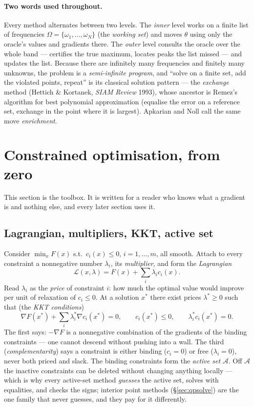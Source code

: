 \documentclass[11pt,a4paper]{article}
\newcommand{\rev}[1]{#1}
\begin{document}
\paragraph{Two words used throughout.}  Every method alternates between two levels.  The
\emph{inner} level works on a finite list of frequencies $\Omega=\{\omega_1,\dots,\omega_N\}$
(the \emph{working set}) and moves $\theta$ using only the oracle's values and gradients
there.  The \emph{outer} level consults the oracle over the whole band --- certifies the
true maximum, locates peaks the list missed --- and updates the list.  Because there are
infinitely many frequencies and finitely many unknowns, the problem is a
\emph{semi-infinite program}, and ``solve on a finite set, add the violated points,
repeat'' is its classical solution pattern --- the \emph{exchange} method (Hettich \&
Kortanek, \emph{SIAM Review} 1993), whose ancestor is Remez's algorithm for best
polynomial approximation (equalise the error on a reference set, exchange in the point
where it is largest).  Apkarian and Noll call the same move \emph{enrichment}.

\section{Constrained optimisation, from zero}
\label{sec:primer}

This section is the toolbox.  It is written for a reader who knows what a gradient is and
nothing else, and every later section uses it.

\subsection{Lagrangian, multipliers, KKT, active set}
Consider $\min_x F(x)$ s.t.\ $c_i(x)\le0$, $i=1,\dots,m$, all smooth.  Attach to every
constraint a nonnegative number $\lambda_i$, its \emph{multiplier}, and form the
\emph{Lagrangian}
\[
\mathcal L(x,\lambda)=F(x)+\sum_i\lambda_ic_i(x).
\]
Read $\lambda_i$ as the \emph{price} of constraint $i$: how much the optimal value would
improve per unit of relaxation of $c_i\le0$.  At a solution $x^\ast$ there exist prices
$\lambda^\ast\ge0$ such that (the \emph{KKT conditions})
\[
\nabla F(x^\ast)+\sum_i\lambda_i^\ast\nabla c_i(x^\ast)=0,\qquad c_i(x^\ast)\le0,\qquad
\lambda_i^\ast c_i(x^\ast)=0 .
\]
The first says: $-\nabla F$ is a nonnegative combination of the gradients of the binding
constraints --- one cannot descend without pushing into a wall.  The third
(\emph{complementarity}) says a constraint is either binding ($c_i=0$) or free
($\lambda_i=0$), never both priced and slack.  The binding constraints form the
\emph{active set} $\mathcal A$.  Off $\mathcal A$ the inactive constraints can be
deleted without changing anything locally --- which is why \rev{every active-set method
\emph{guesses} the active set, solves with equalities, and checks the signs; interior
point methods (\S\ref{sec:qpsolve}) are the one family that never guesses, and they pay
for it differently.}
\end{document}
